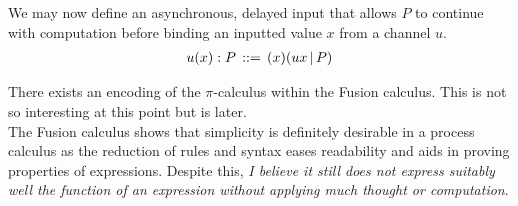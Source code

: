     \begin{example*}
        We may now define an asynchronous, delayed input that allows $P$ to continue with computation before binding an inputted value $x$ from a channel $u$.
        \begin{align}
            u(x): P \, ::= \, (x)(ux \, | \, P)
        \end{align}
    \end{example*}

    
    \begin{remarks}
        There exists an encoding of the $\pi$-calculus within the Fusion calculus.
        This is not so interesting at this point but is later. \\
        The Fusion calculus shows that simplicity is definitely desirable in a process calculus as the reduction of rules and syntax eases readability and aids in proving properties of expressions.
        Despite this, \textit{I believe it still does not express suitably well the function of an expression without applying much thought or computation}.
    \end{remarks}
